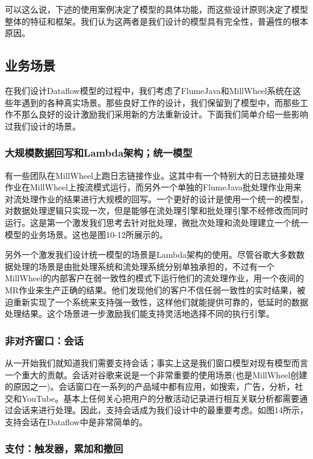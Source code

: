 \documentclass[oneside]{ctexbook}
\begin{document}
可以这么说，下述的使用案例决定了模型的具体功能，而这些设计原则决定了模型整体的特征和框架。我们认为这两者是我们设计的模型具有完全性，普遍性的根本原因。

\subsection{业务场景}

在我们设计Dataflow模型的过程中，我们考虑了FlumeJava和MillWheel系统在这些年遇到的各种真实场景。那些良好工作的设计，我们保留到了模型中，而那些工作不那么良好的设计激励我们采用新的方法重新设计。下面我们简单介绍一些影响过我们设计的场景。

\subsubsection{大规模数据回写和Lambda架构；统一模型}

有一些团队在MillWheel上跑日志链接作业。这其中有一个特别大的日志链接处理作业在MillWheel上按流模式运行，而另外一个单独的FlumeJava批处理作业用来对流处理作业的结果进行大规模的回写。一个更好的设计是使用一个统一的模型，对数据处理逻辑只实现一次，但是能够在流处理引擎和批处理引擎不经修改而同时运行。这是第一个激发我们思考去针对批处理，微批次处理和流处理建立一个统一模型的业务场景。这也是图10-12所展示的。

另外一个激发我们设计统一模型的场景是Lambda架构的使用。尽管谷歌大多数数据处理的场景是由批处理系统和流处理系统分别单独承担的，不过有一个MillWheel的内部客户在弱一致性的模式下运行他们的流处理作业，用一个夜间的MR作业来生产正确的结果。他们发现他们的客户不信任弱一致性的实时结果，被迫重新实现了一个系统来支持强一致性，这样他们就能提供可靠的，低延时的数据处理结果。这个场景进一步激励我们能支持灵活地选择不同的执行引擎。

\subsubsection{非对齐窗口：会话}

从一开始我们就知道我们需要支持会话；事实上这是我们窗口模型对现有模型而言一个重大的贡献。会话对谷歌来说是一个非常重要的使用场景(也是MillWheel创建的原因之一)。会话窗口在一系列的产品域中都有应用，如搜索，广告，分析，社交和YouTube。基本上任何关心把用户的分散活动记录进行相互关联分析都需要通过会话来进行处理。因此，支持会话成为我们设计中的最重要考虑。如图14所示，支持会话在Dataflow中是非常简单的。

\subsubsection{支付：触发器，累加和撤回}
\end{document}
